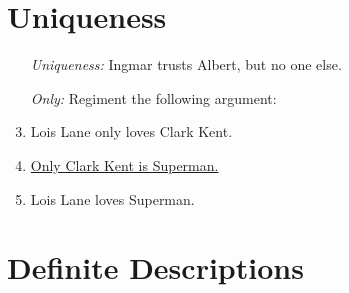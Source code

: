\documentclass[a4paper, 11pt]{article} %
\begin{document}
\section*{Uniqueness}

\begin{enumerate}
  \item[\it Uniqueness:] Ingmar trusts Albert, but no one else.
  \item[\it Only:] Regiment the following argument:
    \item Lois Lane only loves Clark Kent.
    \item \underline{Only Clark Kent is Superman.}
    \item Lois Lane loves Superman.
\end{enumerate}





\section*{Definite Descriptions}
\end{document}
